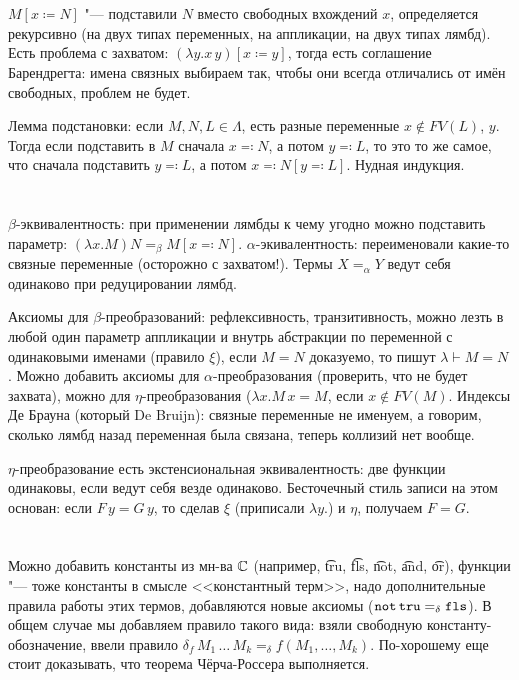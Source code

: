 \section{} %
$M[x \coloneq N]$ "--- подставили $N$ вместо свободных вхождений $x$,
определяется рекурсивно (на двух типах переменных, на аппликации, на двух типах лямбд).
Есть проблема с захватом: $(\lambda y. x\, y)[x \coloneq y]$, тогда есть соглашение
Барендрегта: имена связных выбираем так, чтобы они всегда отличались от имён свободных,
проблем не будет.

Лемма подстановки: если $M, N, L \in \Lambda$, есть разные переменные $x \notin FV(L)$, $y$.
Тогда если подставить в $M$ сначала $x\eqcolon N$, а потом $y \eqcolon L$, то это
то же самое, что сначала подставить $y \eqcolon L$, а потом $x\eqcolon N[y\eqcolon L]$.
Нудная индукция.

\section{} %
$\beta$-эквивалентность: при применении лямбды к чему угодно можно подставить параметр:
$(\lambda x . M)N =_\beta M[x\eqcolon N]$.
$\alpha$-экивалентность: переименовали какие-то связные переменные (осторожно с захватом!).
Термы $X=_\alpha Y$ ведут себя одинаково при редуцировании лямбд.

Аксиомы для $\beta$-преобразований: рефлексивность, транзитивность, можно лезть в любой один
параметр аппликации и внутрь абстракции по переменной с одинаковыми именами (правило $\xi$),
если $M=N$ доказуемо, то пишут $\lambda \vdash M = N$.
Можно добавить аксиомы для $\alpha$-преобразования (проверить, что не будет захвата),
можно для $\eta$-преобразования ($\lambda x . M\, x = M$, если $x \notin FV(M)$.
Индексы Де Брауна (который De Bruijn): связные переменные не именуем, а говорим, сколько лямбд
назад переменная была связана, теперь коллизий нет вообще.

$\eta$-преобразование есть экстенсиональная эквивалентность: две функции одинаковы, если ведут
себя везде одинаково.
Бесточечный стиль записи на этом основан: если $F\, y = G\, y$, то сделав $\xi$ (приписали $\lambda y .$) и $\eta$,
получаем $F=G$.

\section{} %
Можно добавить константы из мн-ва $\mathbb{C}$ (например, \t{tru}, \t{fls}, \t{not}, \t{and}, \t{or}),
функции "--- тоже константы в смысле <<константный терм>>,
надо дополнительные правила работы этих термов, добавляются новые аксиомы ($\texttt{not}\,\texttt{tru}=_\delta \texttt{fls}$).
В общем случае мы добавляем правило такого вида: взяли свободную константу-обозначение,
ввели правило $\delta_f\,M_1\,\dots\,M_k =_\delta f(M_1, \dots, M_k)$.
По-хорошему еще стоит доказывать, что теорема Чёрча-Россера выполняется.

